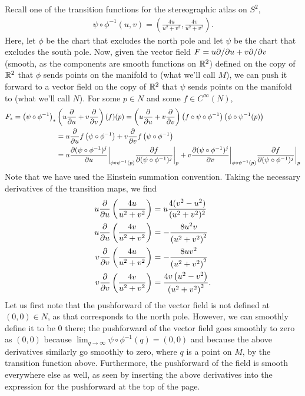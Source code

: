 \documentclass{../../mathnotes}
\begin{document}
Recall one of the transition functions for the stereographic atlas on $S^2$,
\begin{align*}
    \psi\circ\phi^{-1}(u,v)=\left( \frac{4u}{u^2+v^2},\frac{4v}{u^2+v^2} \right).
\end{align*}
Here, let $\phi$ be the chart that excludes the north pole and let $\psi$ be the chart that excludes the
south pole.
Now, given the vector field $F=u\partial/\partial u+v\partial/\partial v$ (smooth, as the components are smooth functions on $\mathbb{R}^2$)
defined on the copy of $\mathbb{R}^2$ that $\phi$ sends points on the manifold to (what we'll call $M$), we can push it forward to a 
vector field on the copy of $\mathbb{R}^2$ that $\psi$ sends points on the manifold to (what we'll call $N$). For some $p\in N$ and
some $f\in C^\infty(N)$,
\begin{align*}
    F_*=\left( \psi \circ \phi^{-1} \right)_*&\left( u\frac{\partial}{\partial u} + v\frac{\partial}{\partial v} \right)(f)(p)
    =\left(u\frac{\partial}{\partial u}+v\frac{\partial}{\partial v}\right)\left(f\circ \psi \circ \phi^{-1}\right)\left(\phi\circ\psi^{-1}(p)\right)\\
    &=u\frac{\partial}{\partial u}f\left( \psi\circ\phi^{-1} \right)+v\frac{\partial}{\partial v}f\left( \psi \circ \phi^{-1} \right)\\
    &=u\frac{\partial(\psi\circ\phi^{-1})^j}{\partial u}\bigg|_{\phi\circ\psi^{-1}(p)}\frac{\partial f}{\partial(\psi\circ\phi^{-1})^j}\bigg|_p
    +v\frac{\partial(\psi\circ\phi^{-1})^j}{\partial v}\bigg|_{\phi\circ\psi^{-1}(p)}\frac{\partial f}{\partial(\psi\circ\phi^{-1})^j}\bigg|_p
\end{align*}
Note that we have used the Einstein summation convention. Taking the necessary derivatives of the transition
maps, we find
\begin{align*}
    u\frac{\partial}{\partial u}\left( \frac{4u}{u^2+v^2} \right)&=u\frac{4(v^2-u^2)}{(u^2+v^2)^2}\\
    u\frac{\partial}{\partial u}\left( \frac{4v}{u^2+v^2} \right)&=-\frac{8 u^2 v}{\left(u^2+v^2\right)^2}\\
    v\frac{\partial}{\partial v}\left( \frac{4u}{u^2+v^2} \right)&=-\frac{8 u v^2}{\left(u^2+v^2\right)^2}\\
    v\frac{\partial}{\partial v}\left( \frac{4v}{u^2+v^2} \right)&=\frac{4 v \left(u^2-v^2\right)}{\left(u^2+v^2\right)^2}.
\end{align*}
Let us first note that the pushforward of the vector field is not defined at $(0,0)\in N$, as that corresponds
to the north pole. However, we can smoothly define it to be 0 there; the pushforward of the vector field
goes smoothly to zero as $(0,0)$ because $\lim_{q\to\infty}\psi\circ\phi^{-1}(q)=(0,0)$ and because the above
derivatives similarly go smoothly to zero, where $q$ is a point on $M$,
by the transition function above. Furthermore, the pushforward of the field is smooth everywhere else as well,
as seen by inserting the above derivatives into the expression for the pushforward at the top of the page.
\end{document}
